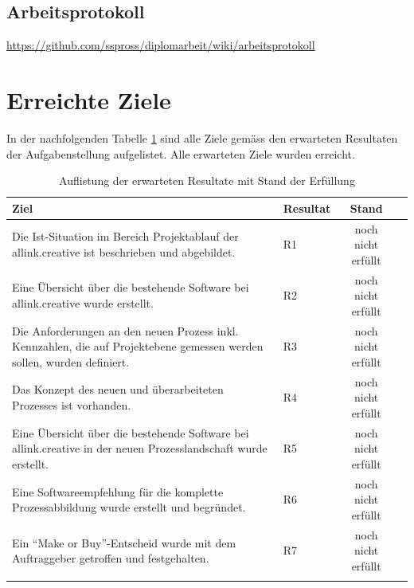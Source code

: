 \subsection{Arbeitsprotokoll}
\url{https://github.com/sspross/diplomarbeit/wiki/arbeitsprotokoll}

\section{Erreichte Ziele}
In der nachfolgenden Tabelle \ref{tab:erreichte_ziele} sind alle Ziele gemäss 
den erwarteten Resultaten der Aufgabenstellung aufgelistet. Alle 
erwarteten Ziele wurden erreicht.

\begin{center}
    \begin{longtable}{p{8cm}lcl}
        \toprule \textbf{Ziel} & \textbf{Resultat} & \textbf{Stand} \\
        \midrule Die Ist-Situation im Bereich Projektablauf der allink.creative
            ist beschrieben und abgebildet. & R1 & noch nicht erfüllt \\
        \midrule Eine Übersicht über die bestehende Software bei allink.creative
            wurde erstellt. & R2 & noch nicht erfüllt \\
        \midrule Die Anforderungen an den neuen Prozess inkl. Kennzahlen, die auf 
            Projektebene gemessen werden sollen, wurden definiert. & R3 
            & noch nicht erfüllt \\
        \midrule Das Konzept des neuen und überarbeiteten Prozesses ist 
            vorhanden. & R4 & noch nicht erfüllt \\
        \midrule Eine Übersicht über die bestehende Software bei allink.creative
            in der neuen Prozesslandschaft wurde erstellt. & R5 & noch nicht erfüllt \\
        \midrule Eine Softwareempfehlung für die komplette Prozessabbildung
            wurde erstellt und begründet. & R6 & noch nicht erfüllt \\
        \midrule Ein ``Make or Buy''-Entscheid wurde mit dem Auftraggeber 
            getroffen und festgehalten. & R7 & noch nicht erfüllt \\
        \bottomrule
        \caption{Auflistung der erwarteten Resultate mit Stand der Erfüllung}
        \label{tab:erreichte_ziele}
    \end{longtable}
\end{center}
